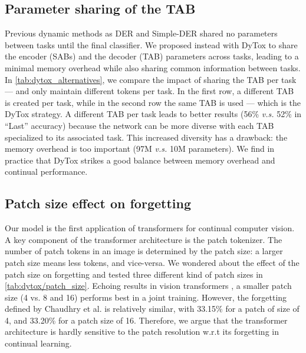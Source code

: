 


%

\subsection{Parameter sharing of the TAB}

Previous dynamic methods as DER \cite{yan2021der} and Simple-DER \cite{li2021preserve} shared no
parameters between tasks until the final classifier. We proposed instead with DyTox to share the
encoder (SABs) and the decoder (TAB) parameters across tasks, leading to a minimal memory overhead
while also sharing common information between tasks. In \autoref{tab:dytox_alternatives}, we compare the
impact of sharing the TAB per task --- and only maintain different tokens per task. In the first
row, a different TAB is created per task, while in the second row the same TAB is used --- which is
the DyTox strategy. A different TAB per task leads to better results (56\% \textit{v.s.} 52\% in
``Last'' accuracy) because the network can be more diverse with each TAB specialized to its
associated task. This increased diversity has a drawback: the memory overhead is too important (97M
\textit{v.s.} 10M parameters). We find in practice that DyTox strikes a good balance between memory
overhead and continual performance.


\subsection{Patch size effect on forgetting}

Our model is the first application of transformers for continual computer vision. A key component of
the transformer architecture is the patch tokenizer. The number of patch tokens in an image is
determined by the patch size: a larger patch size means less tokens, and vice-versa. We wondered
about the effect of the patch size on forgetting and tested three different kind of patch sizes in
\autoref{tab:dytox/patch_size}. Echoing results in vision transformers
\cite{dosovitskiy2020vit,touvron2021deit}, a smaller patch size (4 vs. 8 and 16) performs best in a
joint training. However, the forgetting defined by Chaudhry et al.
\cite{chaudhry2018riemannien_walk} is relatively similar, with 33.15\% for a patch of size of 4, and
33.20\% for a patch size of 16. Therefore, we argue that the transformer architecture is hardly
sensitive to the patch resolution w.r.t its forgetting in continual learning.


